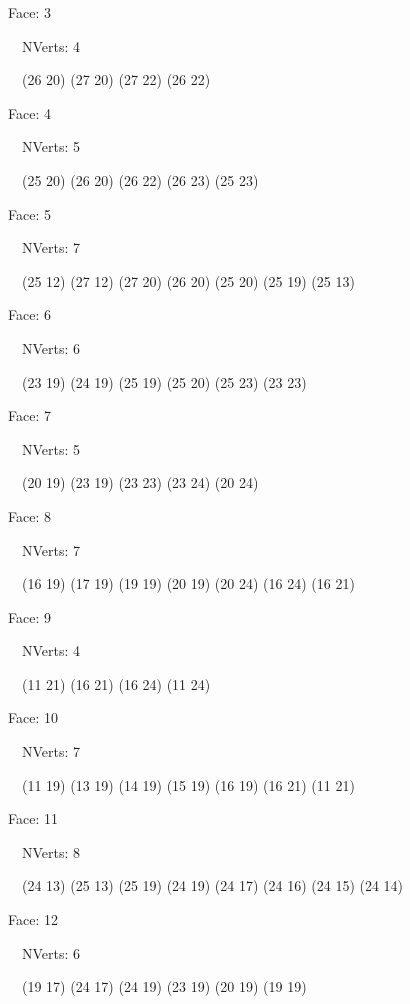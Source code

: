 \documentclass{article}
\begin{document}
{\footnotesize 

Face: 3

\   \    NVerts: 4

 \   \   (26 20) (27 20) (27 22) (26 22)}

{\footnotesize 

Face: 4

\   \    NVerts: 5

 \   \   (25 20) (26 20) (26 22) (26 23) (25 23)}

{\footnotesize 

Face: 5

\   \    NVerts: 7

 \   \   (25 12) (27 12) (27 20) (26 20) (25 20) (25 19) (25 13)}

{\footnotesize 

Face: 6

\   \    NVerts: 6

 \   \   (23 19) (24 19) (25 19) (25 20) (25 23) (23 23)}

{\footnotesize 

Face: 7

\   \    NVerts: 5

 \   \   (20 19) (23 19) (23 23) (23 24) (20 24)}

{\footnotesize 

Face: 8

\   \    NVerts: 7

 \   \   (16 19) (17 19) (19 19) (20 19) (20 24) (16 24) (16 21)}

{\footnotesize 

Face: 9

\   \    NVerts: 4

 \   \   (11 21) (16 21) (16 24) (11 24)}

{\footnotesize 

Face: 10

\   \    NVerts: 7

 \   \   (11 19) (13 19) (14 19) (15 19) (16 19) (16 21) (11 21)}

{\footnotesize 

Face: 11

\   \    NVerts: 8

 \   \   (24 13) (25 13) (25 19) (24 19) (24 17) (24 16) (24 15) (24 14)}

{\footnotesize 

Face: 12

\   \    NVerts: 6

 \   \   (19 17) (24 17) (24 19) (23 19) (20 19) (19 19)}
\end{document}
